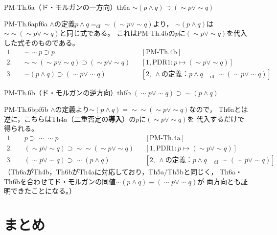 \documentclass[autodetect-engine,dvi=dvipdfmx,ja=standard]{bxjsarticle}
\begin{document}
\begin{theorem}{PM-Th.6a（ド・モルガンの一方向）}{th6a}
\(\sim(p\land q)\supset(\sim p\lor\sim q)\)
\end{theorem}
\begin{tproof}{PM-Th.6a}{pf6a}
\(\land\)の定義\(p\land q=_{\mathrm{df}}\sim(\sim p\lor\sim q)\)より，
\(\sim(p\land q)\)は\(\sim\sim(\sim p\lor\sim q)\)と同じ式である。
これはPM-Th.4bの\(p\)に\((\sim p\lor\sim q)\)を代入した式そのものである。
\begin{align*}
  1.\quad & \sim\sim p\supset p && [\mathrm{PM\text{-}Th.4b}]\\
  2.\quad & \sim\sim(\sim p\lor\sim q)\supset(\sim p\lor\sim q)
    && [1,\mathrm{PDR1}: p\mapsto(\sim p\lor\sim q)]\\
  3.\quad & \sim(p\land q)\supset(\sim p\lor\sim q)
    && [2,\ \land\text{の定義：}p\land q=_{\mathrm{df}}\sim(\sim p\lor\sim q)]
\end{align*}
\end{tproof}

\begin{theorem}{PM-Th.6b（ド・モルガンの逆方向）}{th6b}
\((\sim p\lor\sim q)\supset\sim(p\land q)\)
\end{theorem}
\begin{tproof}{PM-Th.6b}{pf6b}
\(\land\)の定義より\(\sim(p\land q)=\sim\sim(\sim p\lor\sim q)\)なので，
Th6aとは逆に，こちらはTh4a（二重否定の\textbf{導入}）の\(p\)に\((\sim p\lor\sim q)\)を
代入するだけで得られる。
\begin{align*}
  1.\quad & p\supset\sim\sim p && [\mathrm{PM\text{-}Th.4a}]\\
  2.\quad & (\sim p\lor\sim q)\supset\sim\sim(\sim p\lor\sim q)
    && [1,\mathrm{PDR1}: p\mapsto(\sim p\lor\sim q)]\\
  3.\quad & (\sim p\lor\sim q)\supset\sim(p\land q)
    && [2,\ \land\text{の定義：}p\land q=_{\mathrm{df}}\sim(\sim p\lor\sim q)]
\end{align*}
（Th6aがTh4b，Th6bがTh4aに対応しており，Th5a/Th5bと同じく，
Th6a・Th6bを合わせてド・モルガンの同値\(\sim(p\land q)\equiv(\sim p\lor\sim q)\)が
両方向とも証明できたことになる。）
\end{tproof}

\section{まとめ}
\end{document}
